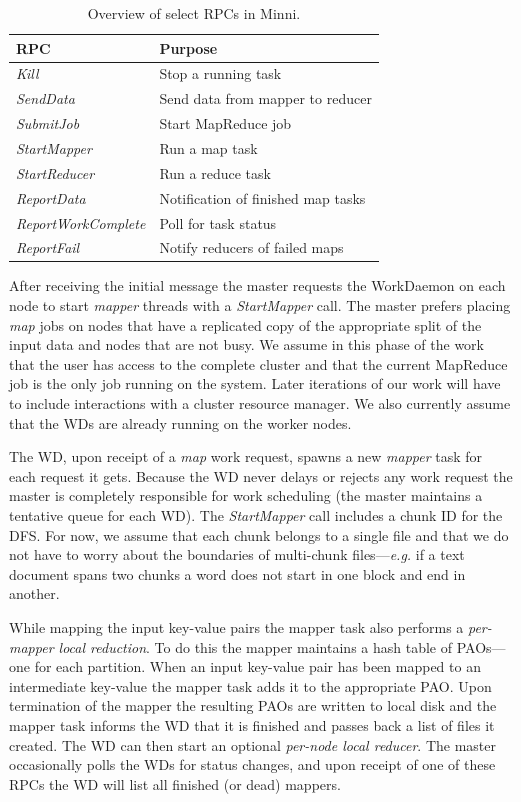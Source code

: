 \documentclass[10pt,letter,final,article,twocolumn]{article} %
\newcommand{\rpc}[1]{\emph{#1}}
\begin{document}
\begin{table}[htdp]
\begin{center}
{\footnotesize
\begin{tabular}{|l|l|}\hline\setlength{\tabcolsep}{1pt}
\label{tab:rpc}
\textbf{RPC} & \textbf{Purpose}\\
\hline
\rpc{Kill} & Stop a running task\\
\rpc{SendData} & Send data from mapper to reducer\\
\rpc{SubmitJob} & Start MapReduce job\\
\rpc{StartMapper} & Run a map task \\
\rpc{StartReducer} & Run a reduce task\\
\rpc{ReportData} & Notification of finished map tasks\\
\rpc{ReportWorkComplete} & Poll for task status\\
\rpc{ReportFail} & Notify reducers of failed maps\\\hline
\end{tabular}}
\end{center}
\caption{Overview of select RPCs in Minni.}
\end{table}

After receiving the initial message the master requests the WorkDaemon on each node to start \emph{mapper} threads with a \rpc{StartMapper} call. The master prefers placing \emph{map} jobs on nodes that have a replicated copy of the appropriate split of the input data and nodes that are not busy.  We assume in this phase of the work that the user has access to the complete cluster and that the current MapReduce job is the only job running on the system. Later iterations of our work will have to include interactions with a cluster resource manager. We also currently assume that the WDs are already running on the worker nodes.

The WD, upon receipt of a \emph{map} work request, spawns a new \emph{mapper} task for each request it gets. Because the WD never delays or rejects any work request the master is completely responsible for work scheduling (the master maintains a tentative queue for each WD). The \rpc{StartMapper} call includes a chunk ID for the DFS. For now, we assume that each chunk belongs to a single file and that we do not have to worry about the boundaries of multi-chunk files---\textit{e.g.} if a text document spans two chunks a word does not start in one block and end in another.

While mapping the input key-value pairs the mapper task also performs a  \emph{per-mapper local reduction}. To do this the mapper maintains a hash table of PAOs---one for each partition. When an input key-value pair has been mapped to an intermediate key-value the mapper task adds it to the appropriate PAO. Upon termination of the mapper the resulting PAOs are written to local disk and the mapper task informs the WD that it is finished and passes back a list of files it created. The WD can then start an optional \emph{per-node local reducer}. The master occasionally polls the WDs for status changes, and upon receipt of one of these RPCs the WD will list all finished (or dead) mappers.
\end{document}

